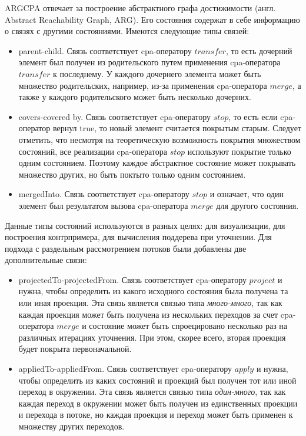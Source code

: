 ARGCPA отвечает за построение абстрактного графа достижимости (англ. Abstract Reachability Graph, ARG). 
Его состояния содержат в себе информацию о связях с другими состояниями.
Имеются следующие типы связей:
\begin{itemize}
\item parent-child. Связь соответствует cpa-оператору $transfer$, то есть дочерний элемент был получен из родительского путем применения cpa-оператора $transfer$ к последнему. 
У каждого дочернего элемента может быть множество родительских, например, из-за применения cpa-оператора $merge$, а также у каждого родительского может быть несколько дочерних.
\item covers-covered by. Связь соответствует cpa-оператору $stop$, то есть если cpa-оператор вернул true, то новый элемент считается покрытым старым. 
Следует отметить, что несмотря на теоретическую возможность покрытия множеством состояний, все реализации cpa-оператора $stop$ используют покрытие только одним состоянием.
Поэтому каждое абстрактное состояние может покрывать множество других, но быть поктыто только одним состоянием.
\item mergedInto.  Связь соответствует cpa-оператору $stop$ и означает, что один элемент был результатом вызова cpa-оператора $merge$ для другого состояния.
\end{itemize}

Данные типы состояний используются в разных целях: для визуализации, для построения контрпримера, для вычисления поддерева при уточнении.
Для подхода с раздельным рассмотрением потоков были добавлены две дополнительные связи:
\begin{itemize}
\item projectedTo-projectedFrom. Связь соответствует cpa-оператору $project$ и нужна, чтобы определить из какого исходного состояния была получена та или иная проекция.
Эта связь является связью типа \textit{много-много}, так как каждая проекция может быть получена из нескольких переходов за счет cpa-оператора $merge$ и состояние может быть спроецировано несколько раз на различных итерациях уточнения. 
При этом, скорее всего, вторая проекция будет покрыта первоначальной.
\item appliedTo-appliedFrom. Связь соответствует cpa-оператору $apply$ и нужна, чтобы определить из каких состояний и проекций был получен тот или иной переход в окружении.
Эта связь является связью типа \textit{один-много}, так как каждая переход в окружении может быть получен из единственных проекции и перехода в потоке, но каждая проекция и переход может быть применен к множеству других переходов.
\end{itemize}

